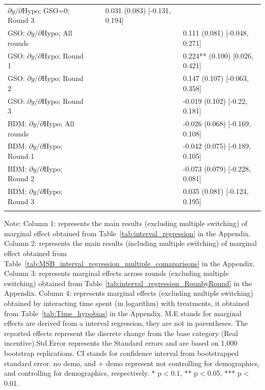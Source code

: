 \documentclass[12pt]{article}
\begin{document}
\begin{table}[H]
\begin{threeparttable}
\begin{tabular}{L{4.5cm} *{4}{C{2.2cm}}}
$\partial y/\partial\mathrm{Hypo}$; GSO=0; Round 3   &       &       & 0.031 (0.083) [-0.131, 0.194]  &       \\
\addlinespace[2pt]
\midrule
GSO: $\partial y/\partial\mathrm{Hypo}$; All rounds  &       &       &       & 0.111 (0.081) [-0.048, 0.271] \\
GSO: $\partial y/\partial\mathrm{Hypo}$; Round 1     &       &       &       & 0.224** (0.100) [0.026, 0.421] \\
GSO: $\partial y/\partial\mathrm{Hypo}$; Round 2     &       &       &       & 0.147 (0.107) [-0.063, 0.358] \\
GSO: $\partial y/\partial\mathrm{Hypo}$; Round 3     &       &       &       & -0.019 (0.102) [-0.22, 0.181] \\
BDM: $\partial y/\partial\mathrm{Hypo}$; All rounds  &       &       &       & -0.026 (0.068) [-0.169, 0.108] \\
BDM: $\partial y/\partial\mathrm{Hypo}$; Round 1     &       &       &       & -0.042 (0.075) [-0.189, 0.105] \\
BDM: $\partial y/\partial\mathrm{Hypo}$; Round 2     &       &       &       & -0.073 (0.079) [-0.228, 0.081] \\
BDM: $\partial y/\partial\mathrm{Hypo}$; Round 3     &       &       &       & 0.035 (0.081) [-0.124, 0.195] \\
\\[-3pt]
\bottomrule
\end{tabular}
\begin{tablenotes}
\footnotesize
\item Note: Column 1: represents the main results (excluding multiple switching) of marginal effect obtained from Table~\ref{tab:interval_regression} in the Appendix. Column 2: represents the main results (including multiple switching) of marginal effect obtained from Table~\ref{tab:MSB_interval_regression_multiple_comaparisons} in the Appendix. Column 3: represents marginal effects across rounds (excluding multiple switching) obtained from Table~\ref{tab:interval_regression_RounbyRound} in the Appendix. Column 4: represents marginal effects  (excluding multiple switching) obtained by interacting time spent (in logarithm) with treatments, it obtained from Table~\ref{tab:Time_hypobias} in the Appendix.
M.E stands for marginal effects are derived from a interval regression, they are not in parentheses. The reported effects represent the discrete change from the base category (Real incentive).Std.Error represents the Standard errors and  are based on 1,000 bootstrap replications. CI stands for confidence interval from bootstrapped standard error. no demo, and + demo represent not controlling for demographics, and controlling for demographics, respectively. * p$<$0.1, ** p$<$0.05, *** p$<$0.01.
\end{tablenotes}
\end{threeparttable}
\end{table}
\end{document}

